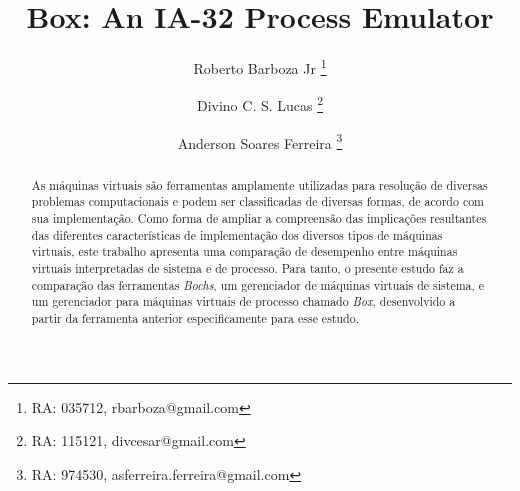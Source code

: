 \documentclass[11pt,twoside]{article}
\begin{document}
% 

%



\TRMakeCover


%
\pagestyle{myheadings}

%
\title{Box: An IA-32 Process Emulator}

\author{
 Roberto Barboza Jr
   \thanks{RA: 035712, rbarboza@gmail.com} \and
 Divino C. S. Lucas
   \thanks{RA: 115121, divcesar@gmail.com} \and
 Anderson Soares Ferreira
   \thanks{RA: 974530, asferreira.ferreira@gmail.com}
}

\date{}

\maketitle


\begin{abstract} 
 As máquinas virtuais são ferramentas amplamente utilizadas para resolução de diversas problemas computacionais e podem ser classificadas de diversas formas, de acordo com sua implementação.
 Como forma de ampliar a compreensão das implicações resultantes das diferentes características de implementação dos diversos tipos de máquinas virtuais, este trabalho apresenta uma comparação de desempenho entre máquinas virtuais interpretadas de sistema e de processo.
 Para tanto, o presente estudo faz a comparação das ferramentas \emph{Bochs}, um gerenciador de máquinas virtuais de sistema, e um gerenciador para máquinas virtuais de processo chamado \emph{Box}, desenvolvido a partir da ferramenta anterior especificamente para esse estudo.
\end{abstract}
\end{document}
